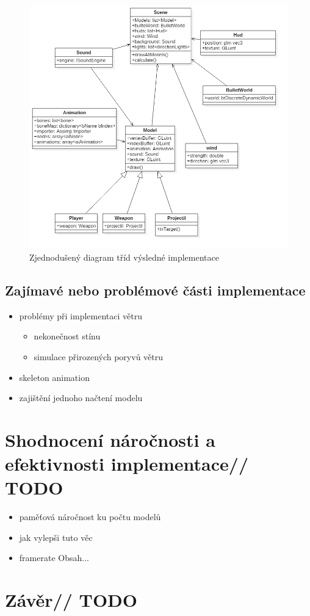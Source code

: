 \begin{figure}
	\begin{center}
		\includegraphics[scale=0.5]{obrazky-figures/ClassDia}
		\caption{Zjednodušený diagram tříd výsledné implementace}\label{ClassDia}
\end{center}\end{figure}


\section{Zajímavé nebo problémové části implementace}
	\begin{itemize}
	 	\item problémy při implementaci větru
	 	\begin{itemize}
	 		\item nekonečnost stínu
	 		\item simulace přirozených poryvů větru 
	 	
	 	\end{itemize}
	 	\item skeleton animation
	 \item zajištění jednoho načtení modelu		
	
	\end{itemize}

\chapter{Shodnocení náročnosti a efektivnosti implementace// TODO}
\begin{itemize}
	\item paměťová náročnost ku počtu modelů
	\item jak vylepši tuto věc
	\item framerate
	Obsah...
\end{itemize}
\chapter{Závěr// TODO}
